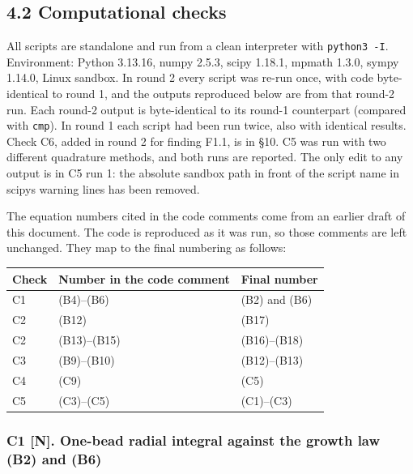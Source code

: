 \documentclass[11pt,a4paper]{article}
\providecommand{\passthrough}[1]{#1}
\begin{document}
\hypertarget{computational-checks}{%
\subsection{4.2 Computational checks}\label{computational-checks}}

All scripts are standalone and run from a clean interpreter with \passthrough{\lstinline!python3 -I!}. Environment: Python 3.13.16, numpy 2.5.3, scipy 1.18.1, mpmath 1.3.0, sympy 1.14.0, Linux sandbox. In round 2 every script was re-run once, with code byte-identical to round 1, and the outputs reproduced below are from that round-2 run. Each round-2 output is byte-identical to its round-1 counterpart (compared with \passthrough{\lstinline!cmp!}). In round 1 each script had been run twice, also with identical results. Check C6, added in round 2 for finding F1.1, is in §10. C5 was run with two different quadrature methods, and both runs are reported. The only edit to any output is in C5 run 1: the absolute sandbox path in front of the script name in scipy\textquotesingle s warning lines has been removed.

The equation numbers cited in the code comments come from an earlier draft of this document. The code is reproduced as it was run, so those comments are left unchanged. They map to the final numbering as follows:

\begin{longtable}[]{@{}lll@{}}
\toprule\noalign{}
Check & Number in the code comment & Final number \\
\midrule\noalign{}
\endhead
\bottomrule\noalign{}
\endlastfoot
C1 & (B4)--(B6) & (B2) and (B6) \\
C2 & (B12) & (B17) \\
C2 & (B13)--(B15) & (B16)--(B18) \\
C3 & (B9)--(B10) & (B12)--(B13) \\
C4 & (C9) & (C5) \\
C5 & (C3)--(C5) & (C1)--(C3) \\
\end{longtable}

\hypertarget{c1-n.-one-bead-radial-integral-against-the-growth-law-b2-and-b6}{%
\subsubsection{C1 {[}N{]}. One-bead radial integral against the growth law (B2) and (B6)}\label{c1-n.-one-bead-radial-integral-against-the-growth-law-b2-and-b6}}
\end{document}
